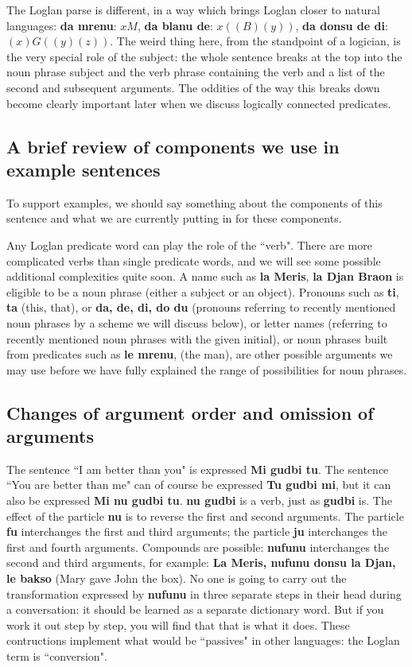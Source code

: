 \documentclass[12pt]{book}
\begin{document}
{The Loglan parse is different, in a way which brings Loglan closer to natural languages:  {\bf da mrenu}:  $xM$, {\bf da blanu de}:  $x((B)(y))$, {\bf da donsu de di}:  $(x)G((y)(z))$.  The weird thing here, from the standpoint of a logician, is the very special role of the subject:  the whole sentence breaks at the top into the noun phrase subject and the verb phrase containing the verb and  a list of the second and subsequent arguments.  The oddities of the way this breaks down become clearly important later when we discuss logically connected predicates.

\subsection{A brief review of components we use in example sentences}

To support examples, we should say something about the components of this sentence and what we are currently putting in for these components.

Any Loglan predicate word can play the role of the ``verb".  There are more complicated verbs than single predicate words, and we will see some possible additional complexities quite soon.  A name such as {\bf la Meris}, {\bf la Djan Braon} is eligible to be a noun phrase (either a subject or an object).  Pronouns such as {\bf ti}, {\bf ta} (this, that), or {\bf da, de, di, do du} (pronouns referring to recently mentioned noun phrases by a scheme we will discuss below), or letter names (referring to recently mentioned noun phrases with the given initial), or noun phrases built from predicates such as {\bf le mrenu}, (the man), are other possible arguments we may use before we have fully explained the range of possibilities for noun phrases.

\subsection{Changes of argument order and omission of arguments}

The sentence ``I am better than you" is expressed {\bf Mi gudbi tu}.  The sentence ``You are better than me" can of course be expressed {\bf Tu gudbi mi}, but it can also be expressed {\bf Mi nu gudbi tu}.  {\bf nu gudbi} is a verb, just as {\bf gudbi} is.  The effect of the particle {\bf nu} is to reverse the first and second arguments.  The particle {\bf fu}
interchanges the first and third arguments;  the particle {\bf ju} interchanges the first and fourth arguments.  Compounds are possible:  {\bf nufunu} interchanges the second and third arguments, for example:  {\bf La Meris, nufunu donsu la Djan, le bakso} (Mary gave John the box).  No one is going to carry out the transformation expressed by {\bf nufunu} in three separate steps in their head during a conversation:  it should be learned as a separate dictionary word.  But if you work it out step by step, you will find that that is what it does.  These contructions implement what would be ``passives" in other languages:  the Loglan term is ``conversion".

}
\end{document}
